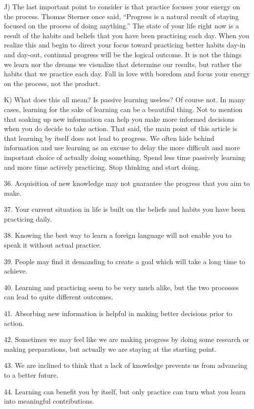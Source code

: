 \documentclass[UTF8,11pt]{ctexart}
\begin{document}
J) The last important point to consider is that practice focuses your energy on the process. Thomas Sterner once said, “Progress is a natural result of staying focused on the process of doing anything.” The state of your life right now is a result of the habits and beliefs that you have been practicing each day. When you realize this and begin to direct your focus toward practicing better habits day-in and day-out, continual progress will be the logical outcome. It is not the things we learn nor the dreams we visualize that determine our results, but rather the habits that we practice each day. Fall in love with boredom and focus your energy on the process, not the product.


K) What does this all mean? Is passive learning useless? Of course not. In many cases, learning for the sake of learning can be a beautiful thing. Not to mention that soaking up new information can help you make more informed decisions when you do decide to take action. That said, the main point of this article is that learning by itself does not lead to progress. We often hide behind information and use learning as an excuse to delay the more difficult and more important choice of actually doing something. Spend less time passively learning and more time actively practicing. Stop thinking and start doing.


36. Acquisition of new knowledge may not guarantee the progress that you aim to make.


37. Your current situation in life is built on the beliefs and habits you have been practicing daily.


38. Knowing the best way to learn a foreign language will not enable you to speak it without actual practice.


39. People may find it demanding to create a goal which will take a long time to achieve.


40. Learning and practicing seem to be very much alike, but the two processes can lead to quite different outcomes.


41. Absorbing new information is helpful in making better decisions prior to action.


42. Sometimes we may feel like we are making progress by doing some research or making preparations, but actually we are staying at the starting point.


43. We are inclined to think that a lack of knowledge prevents us from advancing to a better future.


44. Learning can benefit you by itself, but only practice can turn what you learn into meaningful contributions.
\end{document}
